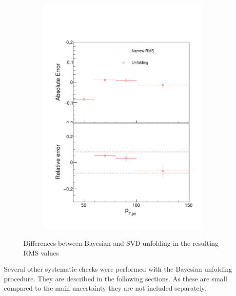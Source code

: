 \begin{figure}
\begin{subfigure}{0.24\textwidth}
\end{subfigure}
\begin{subfigure}{0.24\textwidth}
\includegraphics[width=0.95\textwidth]{results/SystematicErrors/SystematicErrorsGausRMS_UnfNFin00JetPt08_linx_data}
\end{subfigure}
\caption{Differences between Bayesian and SVD unfolding in the resulting RMS values}
\label{fig:systunf}
\end{figure}

Several other systematic checks were performed with the Bayesian unfolding procedure. They are described in the following sections. As these are small compared to the main uncertainty they are not included separately.
 
  
